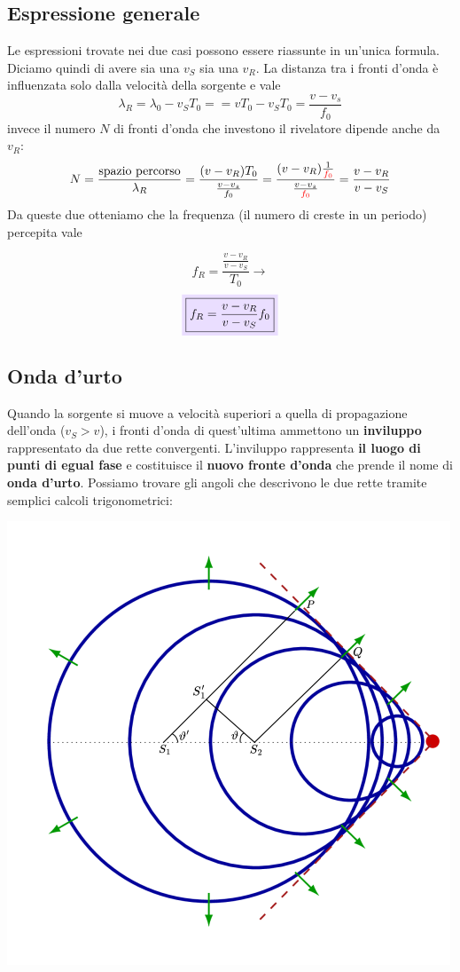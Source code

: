 \documentclass[x11names]{report}
\newcommand{\viola}[1]{\colorbox{yred}{$\displaystyle #1$}}
\begin{document}
	\subsection{Espressione generale}
	Le espressioni trovate nei due casi possono essere riassunte in un'unica formula. Diciamo quindi di avere sia una \(v_S\) sia una \(v_R\). La distanza tra i fronti d'onda è influenzata solo dalla velocità della sorgente e vale
	\[ 
	\lambda_R = \lambda_0 - v_ST_0 = = vT_0 - v_ST_0 = \frac{v - v_s}{f_0}
	\]
	invece il numero \(N\) di fronti d'onda che investono il rivelatore dipende anche da \(v_R\):
	\[ 
	N = \frac{\text{spazio percorso}}{\lambda_R} = \frac{(v - v_R)T_0}{\frac{v - v_s}{f_0}} = \frac{(v - v_R)\frac{1}{\textcolor{red}{f_0}}}{\frac{v - v_s}{\textcolor{red}{f_0}}} = \frac{v - v_R}{v - v_S}
	\]
	Da queste due otteniamo che la frequenza (il numero di creste in un periodo) percepita vale
	
	\[ 
	f_R = \frac{\frac{v - v_R}{v-v_S}}{T_0} \to
	\]
	\begin{equation}
		\viola{\boxed{f_R = \frac{v - v_R}{v-v_S}f_0}}
	\end{equation}
	
	\subsection{Onda d'urto}
	Quando la sorgente si muove a velocità superiori a quella di propagazione dell'onda (\(v_S > v\)), i fronti d'onda di quest'ultima ammettono un \textbf{inviluppo} rappresentato da due rette convergenti. L'inviluppo rappresenta \textbf{il luogo di punti di egual fase} e costituisce il  \textbf{nuovo fronte d'onda} che prende il nome di \textbf{onda d'urto}. Possiamo trovare gli angoli che descrivono le due rette tramite semplici calcoli trigonometrici: 
	
		\begin{center}
			\includegraphics[scale=0.4]{imgs/ondaurto.png}
		\end{center}
	
\end{document}
